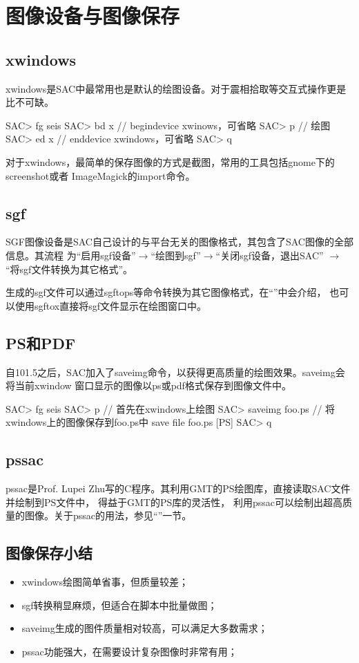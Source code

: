 \section{图像设备与图像保存}
\label{sec:save-image}

\subsection{xwindows}
xwindows是SAC中最常用也是默认的绘图设备。对于震相拾取等交互式操作更是比不可缺。
\begin{SACCode}
SAC> fg seis
SAC> bd x       // begindevice xwinows，可省略
SAC> p          // 绘图
SAC> ed x       // enddevice xwindows，可省略
SAC> q
\end{SACCode}

对于xwindows，最简单的保存图像的方式是截图，常用的工具包括gnome下的screenshot或者
ImageMagick的import命令。

\subsection{sgf}
SGF图像设备是SAC自己设计的与平台无关的图像格式，其包含了SAC图像的全部信息。其流程
为``启用sgf设备''$\rightarrow$``绘图到sgf''$\rightarrow$``关闭sgf设备，退出SAC''
$\rightarrow$``将sgf文件转换为其它格式''。

生成的sgf文件可以通过sgftops等命令转换为其它图像格式，在``''中会介绍，
也可以使用sgftox直接将sgf文件显示在绘图窗口中。

\subsection{PS和PDF}
自101.5之后，SAC加入了saveimg命令，以获得更高质量的绘图效果。saveimg会将当前xwindow
窗口显示的图像以ps或pdf格式保存到图像文件中。

\begin{SACCode}
SAC> fg seis
SAC> p                      // 首先在xwindows上绘图
SAC> saveimg foo.ps         // 将xwindows上的图像保存到foo.ps中
save file foo.ps [PS]
SAC> q
\end{SACCode}

\subsection{pssac}
pssac是Prof. Lupei Zhu写的C程序。其利用GMT的PS绘图库，直接读取SAC文件并绘制到PS文件中，
得益于GMT的PS库的灵活性，
利用pssac可以绘制出超高质量的图像。关于pssac的用法，参见``''一节。

\subsection{图像保存小结}
\begin{itemize}
\item xwindows绘图简单省事，但质量较差；
\item sgf转换稍显麻烦，但适合在脚本中批量做图；
\item saveimg生成的图件质量相对较高，可以满足大多数需求；
\item pssac功能强大，在需要设计复杂图像时非常有用；
\end{itemize}

